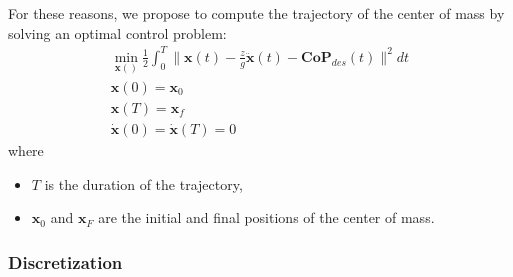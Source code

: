 \documentclass{article}
\newcommand\vect[1]{\mathbf{#1}}
\newcommand\x{\vect{x}}
\newcommand\dx{\vect{\dot{x}}}
\newcommand\ddx{\vect{\ddot{x}}}
\begin{document}
For these reasons, we propose to compute the trajectory of the center of mass by solving an optimal control problem:
\begin{equation}
  \begin{array}{l}
    \min_{\x()}\frac{1}{2}\int_0^T \|\x(t) - \frac{z}{g}\ddx(t) - \vect{CoP}_{des}(t)\|^2 dt\\
    \x(0)=\x_0\\
    \x(T)=\x_f\\
    \dx(0)=\dx(T)=0
  \end{array}
    \label{eq:optimal-control}
\end{equation}
where
\begin{itemize}
\item $T$ is the duration of the trajectory,
\item $\x_0$ and $\x_F$ are the initial and final positions of the center of mass.
\end{itemize}

\subsubsection{Discretization}
\end{document}
